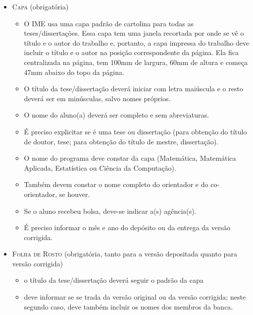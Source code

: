 \begin{itemize}
  \item \textsc{Capa} (obrigatória)
  \begin{itemize}
    \item O IME usa uma capa padrão de cartolina para todas as
    teses/dissertações.  Essa capa tem uma janela recortada por onde se
    vê o título e o autor do trabalho e, portanto, a capa impressa do
    trabalho deve incluir o título e o autor na posição correspondente da
    página. Ela fica centralizada na página, tem 100mm de largura, 60mm de
    altura e começa 47mm abaixo do topo da página.

    \item O título da tese/dissertação deverá iniciar com letra maiúscula
    e o resto deverá ser em minúsculas, salvo nomes próprios.

    \item O nome do aluno(a) deverá ser completo e sem abreviaturas.

    \item É preciso explicitar se é uma tese ou dissertação (para
    obtenção do título de doutor, tese; para obtenção do título de
    mestre, dissertação).

    \item O nome do programa deve constar da capa (Matemática,
    Matemática Aplicada, Estatística ou Ciência da Computação).

    \item Também devem constar o nome completo do orientador e do
    co-orientador, se houver.

    \item Se o aluno recebeu bolsa, deve-se indicar a(s) agência(s).

    \item É preciso informar o mês e ano do depósito ou da entrega da
    versão corrigida.
  \end{itemize}

  \item \textsc{Folha de Rosto} (obrigatória, tanto para a versão
  depositada quanto para versão corrigida)
  \begin{itemize}
    \item o título da tese/dissertação deverá seguir o padrão da capa

    \item deve informar se se trada da versão original ou da versão
    corrigida; neste segundo caso, deve também incluir os nomes
    dos membros da banca.
  \end{itemize}


\end{itemize}
